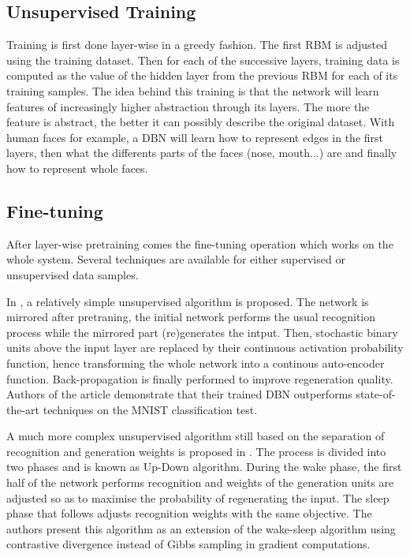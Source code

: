 \documentclass{report}
\begin{document}
	\subsection{Unsupervised Training}
	
	Training is first done layer-wise in a greedy fashion. The first RBM is 
	adjusted using the training dataset. Then for each of the successive layers, 
	training data is computed as the value of the hidden layer from the previous 
	RBM for each of its training samples. The idea behind this training is that the 
	network will learn features of increasingly higher abstraction through its 
	layers. The more the feature is abstract, the better it can possibly describe
	the original dataset. With human faces for example, a DBN will learn how to 
	represent edges in the first layers, then what the differents parts of the 
	faces (nose, mouth...) are and finally how to represent whole faces.
	
	\subsection{Fine-tuning}
	
	After layer-wise pretraining comes the fine-tuning operation which works on the 
	whole system. Several techniques are available for either supervised or 
	unsupervised data samples. 
	
	In \cite{hinton2006reducing}, a relatively simple unsupervised algorithm 
	is proposed. The network is mirrored after pretraning, the initial network 
	performs the usual recognition process while the mirrored part (re)generates 
	the intput. Then, stochastic binary units above the input layer are replaced by 
	their continuous activation probability function, hence transforming the whole 
	network into a continous auto-encoder function. Back-propagation is finally
	performed to improve regeneration quality. Authors of the article demonstrate 
	that their trained DBN outperforms state-of-the-art techniques on the MNIST 
	classification test.
	
	A much more complex unsupervised algorithm still based on the separation of 
	recognition and generation weights is proposed in 
	\cite{hinton2006fast}. The process is divided into two phases 
	and is known as Up-Down algorithm. During the wake phase, the first half of the 
	network performs recognition and weights of the generation units are adjusted 
	so as to maximise the probability of regenerating the input. The sleep phase 
	that follows adjusts recognition weights with the same objective. The authors 
	present this algorithm as an extension of the wake-sleep algorithm 
	\cite{hinton1995wake} using contrastive divergence instead of Gibbs sampling in 
	gradient computations.
	
\end{document}
